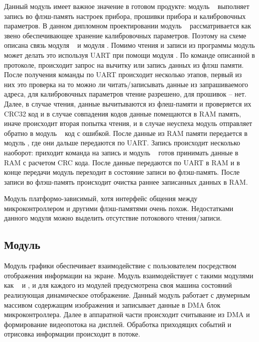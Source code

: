 Данный модуль имеет важное значение в готовом продукте: модуль \moduleFlashMemory~ выполняет запись во флэш-память настроек прибора,
прошивки прибора и калибровочных параметров. В данном дипломном проектировании модуль \moduleFlashMemory~ рассматривается как звено
обеспечивающее хранение калибровочных параметров. Поэтому на схеме описана связь модуля \moduleFlashMemory~ и модуля \moduleCalib.
Помимо чтения и записи из программы модуль может делать это используя UART при помощи модуля \moduleUart.
По команде описанной в протоколе, происходит запрос на вычитку или запись данных из флэш памяти.
После получения команды по UART происходит несколько этапов, первый из них это проверка на то можно ли читать/записывать данные из запрашиваемого адреса,
для калибровочных параметров чтение разрешено, для прошивок  -- нет. Далее, в случае чтения, данные вычитываются из флеш-памяти и проверяется их CRC32
код и в случае совпадения кодов данные помещаются в RAM память, иначе происходит вторая попытка чтения, и в случае неуспеха модуль отправляет обратно в 
модуль \moduleUart~ код с ошибкой. После данные из RAM памяти передается в модуль \moduleUart, где они дальше передаются по UART. Запись происходит несколько наоборот:
приходит команда на запись и модуль \moduleFlashMemory~ готов принимать данные в RAM с расчетом CRC кода. После данные передаются по UART в RAM и в конце передачи модуль переходит в состояние
записи во флэш-память. После записи во флэш-память происходит очистка раннее записанных данных в RAM.

Модуль платформо-зависимый, хотя интерфейс общения между микроконтроллером и другими 
флэш-памятями очень похож. Недостатками данного модуля можно выделить отсутствие потокового чтения/записи.


\subsection{Модуль \moduleGraphics}

Модуль графики обеспечивает взаимодействие с пользователем посредством отображения информации на экране.
Модуль взаимодействует с такими модулями как \moduleFlashMemory~ и \moduleFindTarget, и для каждого из модулей
предусмотрена своя машина состояний реализующая динамическое отображение. Данный модуль работает с двумерным массивом
содержащим изображения и записывает данные в DMA блок микроконтроллера. Далее в аппаратной части происходит считывание из DMA 
и формирование видеопотока на дисплей. Обработка приходящих событий и отрисовка информации происходит в потоке.


